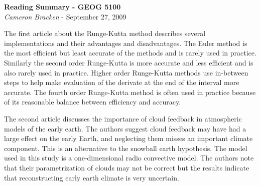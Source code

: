 \documentclass[11pt,oneside]{article}
\begin{document}
\begin{center}
	\textbf{Reading Summary - GEOG 5100}\\
	{\itshape Cameron Bracken} - September 27, 2009
\end{center}

The first article about the Runge-Kutta method describes several implementations and their advantages and disadvantages. The Euler method is the most efficient but least accurate of the methods and is rarely used in practice.   Similarly the second order Runge-Kutta is more accurate and less efficient and is also rarely used in practice.  Higher order Runge-Kutta methods use in-between steps to help make evaluation of the derivate at the  end of the interval more accurate. The fourth order Runge-Kutta method is often used in practice because of its reasonable balance between efficiency and accuracy. 

The second article discusses the importance of cloud feedback in atmospheric models of the early earth.  The authors suggest cloud feedback may have had a large effect on the early Earth, and neglecting them misses an important climate component.  This is an alternative to the snowball earth hypothesis.  The model used in this study is a one-dimensional radio convective model. The authors note that their parametrization of clouds may not be correct but the results indicate that reconstructing early earth climate is very uncertain. 
\end{document}
